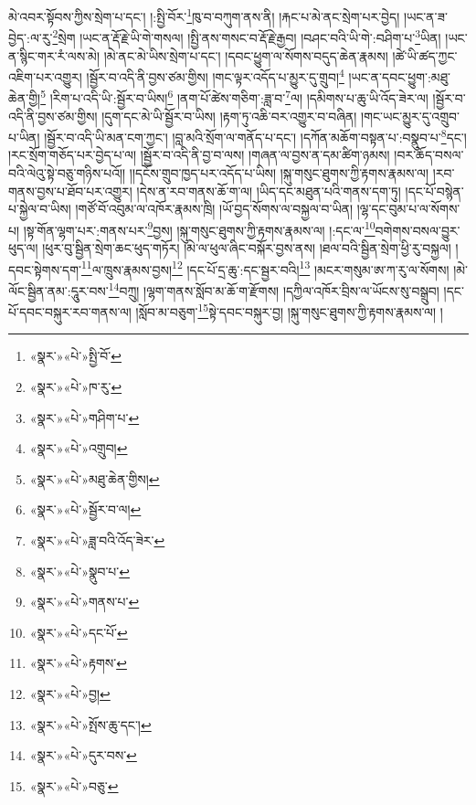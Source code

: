 མེ་འབར་སྟོབས་ཀྱིས་སྲེག་པ་དང་། །:སྤྱི་བོར་\footnote{«སྣར་»«པེ་»སྤྱི་བོ་}ཁུ་བ་བཀུག་ནས་ནི། །རྐང་པ་མེ་ནང་སྲེག་པར་བྱེད། །ཡང་ན་ཟ་བྱེད་:ལ་རུ་\footnote{«སྣར་»«པེ་»ཁ་རུ་}སྲེག །ཡང་ན་རྡོ་རྗེ་ཡི་གེ་གསལ། །སྤྱི་ནས་གསང་བ་རྡོ་རྗེ་རྒྱབ། །བཤང་བའི་ཡི་གེ་:བཤིག་པ་\footnote{«སྣར་»«པེ་»གཤིག་པ་}ཡིན། །ཡང་ན་སྙིང་གར་རཾ་ལས་མེ། །མེ་ནང་མེ་ཡིས་སྲེག་པ་དང་། །དབང་ཕྱུག་ལ་སོགས་བདུད་ཆེན་རྣམས། །ཚེ་ཡི་ཚད་ཀྱང་འཇིག་པར་འགྱུར། །སྦྱོར་བ་འདི་ནི་བྱས་ཙམ་གྱིས། །གང་ལྟར་འདོད་པ་མྱུར་དུ་གྲུབ།\footnote{«སྣར་»«པེ་»འགྲུབ།} །ཡང་ན་དབང་ཕྱུག་:མཐུ་ཆེན་གྱི།\footnote{«སྣར་»«པེ་»མཐུ་ཆེན་གྱིས།} །རིག་པ་འདི་ཡི་:སྦྱོར་བ་ཡིས།\footnote{«སྣར་»«པེ་»སྦྱོར་བ་ལ།} །ནག་པོ་ཚེས་གཅིག་:ཟླ་བ་\footnote{«སྣར་»«པེ་»ཟླ་བའི་འོད་ཟེར་}ལ། །དམིགས་པ་ཆུ་ཡི་འོད་ཟེར་ལ། །སྦྱོར་བ་འདི་ནི་བྱས་ཙམ་གྱིས། །དུག་དང་མེ་ཡི་སྦྱོར་བ་ཡིས། །རྟག་ཏུ་འཆི་བར་འགྱུར་བ་བཞིན། །གང་ཡང་མྱུར་དུ་འགྲུབ་པ་ཡིན། །སྦྱོར་བ་འདི་ཡི་མན་ངག་ཀྱང་། །བླ་མའི་སྲོག་ལ་གནོད་པ་དང་། །དཀོན་མཆོག་བསྟན་པ་:བསྣུབ་པ་\footnote{«སྣར་»«པེ་»སྣུབ་པ་}དང་། །རང་སྲོག་གཅོད་པར་བྱེད་པ་ལ། །སྦྱོར་བ་འདི་ནི་བྱ་བ་ལས། །གཞན་ལ་བྱས་ན་དམ་ཚིག་ཉམས། །བར་ཆོད་བསལ་བའི་ལེའུ་སྟེ་བཅུ་གཉིས་པའོ།། །།དངོས་གྲུབ་ཁྱད་པར་འདོད་པ་ཡིས། །སྐུ་གསུང་ཐུགས་ཀྱི་རྟགས་རྣམས་ལ། །རབ་གནས་བྱས་པ་ཐོབ་པར་འགྱུར། །དེས་ན་རབ་གནས་ཆོ་ག་ལ། །ཡིད་དང་མཐུན་པའི་གནས་དག་ཏུ། །དང་པོ་བསྙེན་པ་སྐྱེལ་བ་ཡིས། །གཙོ་བོ་འབུམ་ལ་འཁོར་རྣམས་ཁྲི། །ཡོ་བྱད་སོགས་ལ་བསྐྱལ་བ་ཡིན། །ལྷ་དང་བུམ་པ་ལ་སོགས་པ། །སྟ་གོན་ལྷག་པར་:གནས་པར་\footnote{«སྣར་»«པེ་»གནས་པ་}བྱས། །སྐུ་གསུང་ཐུགས་ཀྱི་རྟགས་རྣམས་ལ། །:དང་ལ་\footnote{«སྣར་»«པེ་»དང་པོ་}བགེགས་བསལ་བྱུར་ཕུད་ལ། །ཕུར་བུ་སྦྱིན་སྲེག་ཆང་ཕུད་གཏོར། །མེ་ལ་ཕུལ་ཞིང་བསྐོར་བྱས་ནས། །ཐལ་བའི་སྦྱིན་སྲེག་ཕྱི་རུ་བསྐྱལ། །དབང་སྟེགས་དག་\footnote{«སྣར་»«པེ་»རྟགས་}ལ་ཁྲུས་རྣམས་བྱས།\footnote{«སྣར་»«པེ་»བྱ།} །དང་པོ་དྲ་ཆུ་:དང་སྦྱར་བའི།\footnote{«སྣར་»«པེ་»སྤོས་ཆུ་དང་།} །མངར་གསུམ་ཨ་ཀ་རུ་ལ་སོགས། །མེ་ལོང་སྦྱིན་ནམ་:དཱུར་བས་\footnote{«སྣར་»«པེ་»དུར་བས་}བཀྲུ། །ལྷག་གནས་སློབ་མ་ཆོ་ག་རྫོགས། །དཀྱིལ་འཁོར་བྲིས་ལ་ཡོངས་སུ་བསྒྲུབ། །དང་པོ་དབང་བསྐུར་རབ་གནས་ལ། །སློབ་མ་བཅུག་\footnote{«སྣར་»«པེ་»བཅུ་}སྟེ་དབང་བསྐུར་བྱ། །སྐུ་གསུང་ཐུགས་ཀྱི་རྟགས་རྣམས་ལ། །
